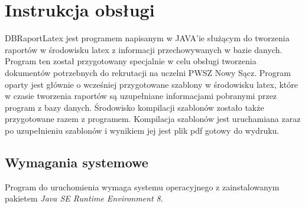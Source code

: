 \chapter{Instrukcja obsługi}
DBRaportLatex jest programem napisanym w JAVA'ie służącym do tworzenia raportów w środowisku latex z informacji przechowywanych w bazie danych. Program ten został przygotowany specjalnie w celu obsługi tworzenia dokumentów potrzebnych do rekrutacji na uczelni PWSZ Nowy Sącz.
Program oparty jest głównie o wcześniej przygotowane szablony w środowisku latex, które w czasie tworzenia raportów są uzupełniane informacjami pobranymi przez program z bazy danych.
Środowisko kompilacji szablonów zostało także przygotowane razem z programem. Kompilacja szablonów jest uruchamiana zaraz po uzupełnieniu szablonów i wynikiem jej jest plik pdf gotowy do wydruku.
\section{Wymagania systemowe}
Program do uruchomienia wymaga systemu operacyjnego z zainstalowanym pakietem \emph{Java SE Runtime Environment 8}.
